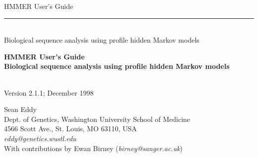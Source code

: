 \documentclass[11pt]{report}
\begin{document}


\begin{titlepage}
{\Large

\vspace*{\fill}

\begin{latexonly}
\noindent
{\Huge \textsf{HMMER User's Guide}} \\ 
\rule[2pt]{\textwidth}{1pt} \\
\hspace*{\fill} {\large \textsf{Biological sequence analysis using
profile hidden Markov models} \\ }
\end{latexonly}

\begin{htmlonly}
\begin{center}
{\Huge \textbf{HMMER User's Guide}}\\
{\large \textbf{Biological sequence analysis using
profile hidden Markov models}}\\
\end{center}
\end{htmlonly}

\vspace*{\fill}

\begin{center}
\textsl{}\\
Version 2.1.1; December 1998 \\ 

\vspace*{\fill}

Sean Eddy\\
Dept. of Genetics, Washington University School of Medicine\\
4566 Scott Ave., St. Louis, MO 63110, USA\\
\textsl{eddy@genetics.wustl.edu} \\
With contributions by Ewan Birney (\textsl{birney@sanger.ac.uk})\\
\end{center}

\vspace*{\fill}

}
\end{titlepage}
\end{document}
